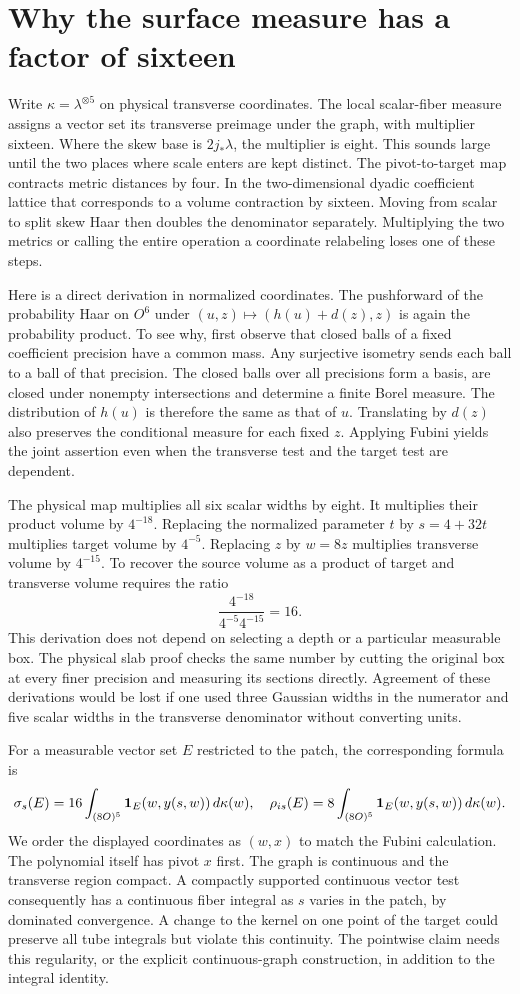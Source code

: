 \documentclass[12pt,letterpaper]{article}
\begin{document}
\section{Why the surface measure has a factor of sixteen}
Write $\kappa=\lambda^{\otimes5}$ on physical transverse coordinates. The local scalar-fiber measure assigns a vector set its transverse preimage under the graph, with multiplier sixteen. Where the skew base is $2j_*\lambda$, the multiplier is eight. This sounds large until the two places where scale enters are kept distinct. The pivot-to-target map contracts metric distances by four. In the two-dimensional dyadic coefficient lattice that corresponds to a volume contraction by sixteen. Moving from scalar to split skew Haar then doubles the denominator separately. Multiplying the two metrics or calling the entire operation a coordinate relabeling loses one of these steps.

Here is a direct derivation in normalized coordinates. The pushforward of the probability Haar on $O^6$ under $(u,z)\mapsto(h(u)+d(z),z)$ is again the probability product. To see why, first observe that closed balls of a fixed coefficient precision have a common mass. Any surjective isometry sends each ball to a ball of that precision. The closed balls over all precisions form a basis, are closed under nonempty intersections and determine a finite Borel measure. The distribution of $h(u)$ is therefore the same as that of $u$. Translating by $d(z)$ also preserves the conditional measure for each fixed $z$. Applying Fubini yields the joint assertion even when the transverse test and the target test are dependent.

The physical map multiplies all six scalar widths by eight. It multiplies their product volume by $4^{-18}$. Replacing the normalized parameter $t$ by $s=4+32t$ multiplies target volume by $4^{-5}$. Replacing $z$ by $w=8z$ multiplies transverse volume by $4^{-15}$. To recover the source volume as a product of target and transverse volume requires the ratio
\[
               \frac{4^{-18}}{4^{-5}4^{-15}}=16.
\]
This derivation does not depend on selecting a depth or a particular measurable box. The physical slab proof checks the same number by cutting the original box at every finer precision and measuring its sections directly. Agreement of these derivations would be lost if one used three Gaussian widths in the numerator and five scalar widths in the transverse denominator without converting units.

For a measurable vector set $E$ restricted to the patch, the corresponding formula is
\[
 \sigma_s(E)=16\int_{(8O)^5}{\bf1}_E(w,y(s,w))\,d\kappa(w),\quad
 \rho_{is}(E)=8\int_{(8O)^5}{\bf1}_E(w,y(s,w))\,d\kappa(w).
\]
We order the displayed coordinates as $(w,x)$ to match the Fubini calculation. The polynomial itself has pivot $x$ first. The graph is continuous and the transverse region compact. A compactly supported continuous vector test consequently has a continuous fiber integral as $s$ varies in the patch, by dominated convergence. A change to the kernel on one point of the target could preserve all tube integrals but violate this continuity. The pointwise claim needs this regularity, or the explicit continuous-graph construction, in addition to the integral identity.
\end{document}
